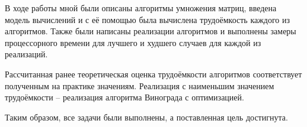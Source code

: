 
В ходе работы мной были описаны алгоритмы умножения матриц, введена модель вычислений и с её помощью была вычислена трудоёмкость каждого из алгоритмов. Также были написаны реализации алгоритмов и выполнены замеры процессорного времени для лучшего и худшего случаев для каждой из реализаций.

Рассчитанная ранее теоретическая оценка трудоёмкости алгоритмов соответствует полученным на практике значениям. Реализация с наименьшим значением трудоёмкости -- реализация алгоритма Винограда с оптимизацией.

Таким образом, все задачи были выполнены, а поставленная цель достигнута.